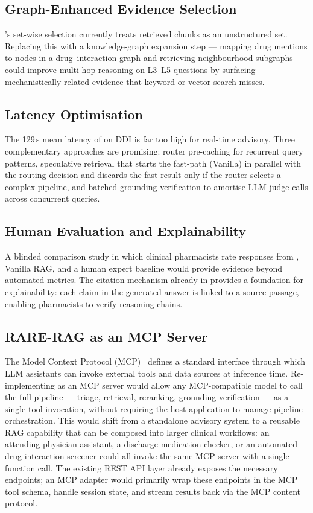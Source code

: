\subsection{Graph-Enhanced Evidence Selection}
\rarerag{}'s set-wise selection currently treats retrieved chunks as an
unstructured set.
Replacing this with a knowledge-graph expansion step --- mapping drug mentions
to nodes in a drug--interaction graph and retrieving neighbourhood subgraphs ---
could improve multi-hop reasoning on L3--L5 questions by surfacing mechanistically
related evidence that keyword or vector search misses.

\subsection{Latency Optimisation}
The 129\,s mean latency of \rarerag{} on DDI is far too high for real-time advisory.
Three complementary approaches are promising: router pre-caching for
recurrent query patterns, speculative retrieval that starts the fast-path
(Vanilla) in parallel with the routing decision and discards the fast result
only if the router selects a complex pipeline, and batched grounding
verification to amortise LLM judge calls across concurrent queries.

\subsection{Human Evaluation and Explainability}
A blinded comparison study in which clinical pharmacists rate responses from
\rarerag{}, Vanilla RAG, and a human expert baseline would provide evidence
beyond automated metrics.
The citation mechanism already in \medrag{} provides a foundation for
explainability: each claim in the generated answer is linked to a source
passage, enabling pharmacists to verify reasoning chains.

\subsection{RARE-RAG as an MCP Server}
The Model Context Protocol (MCP)~\cite{anthropic2024mcp} defines a standard
interface through which LLM assistants can invoke external tools and data
sources at inference time.
Re-implementing \rarerag{} as an MCP server would allow any MCP-compatible
model to call the full pipeline --- triage, retrieval, reranking, grounding
verification --- as a single tool invocation, without requiring the host
application to manage pipeline orchestration.
This would shift \medrag{} from a standalone advisory system to a reusable
RAG capability that can be composed into larger clinical workflows: an
attending-physician assistant, a discharge-medication checker, or an automated
drug-interaction screener could all invoke the same \rarerag{} MCP server with
a single function call.
The existing REST API layer already exposes the necessary endpoints; an MCP
adapter would primarily wrap these endpoints in the MCP tool schema, handle
session state, and stream results back via the MCP content protocol.

